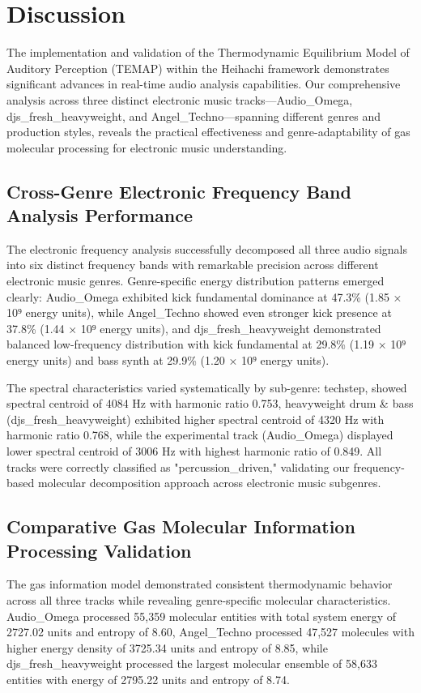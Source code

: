 \section{Discussion}

The implementation and validation of the Thermodynamic Equilibrium Model of Auditory Perception (TEMAP) within the Heihachi framework demonstrates significant advances in real-time audio analysis capabilities. Our comprehensive analysis across three distinct electronic music tracks—Audio\_Omega, djs\_fresh\_heavyweight, and Angel\_Techno—spanning different genres and production styles, reveals the practical effectiveness and genre-adaptability of gas molecular processing for electronic music understanding.

\subsection{Cross-Genre Electronic Frequency Band Analysis Performance}

The electronic frequency analysis successfully decomposed all three audio signals into six distinct frequency bands with remarkable precision across different electronic music genres. Genre-specific energy distribution patterns emerged clearly: Audio\_Omega exhibited kick fundamental dominance at 47.3\% (1.85 × 10⁹ energy units), while Angel\_Techno showed even stronger kick presence at 37.8\% (1.44 × 10⁹ energy units), and djs\_fresh\_heavyweight demonstrated balanced low-frequency distribution with kick fundamental at 29.8\% (1.19 × 10⁹ energy units) and bass synth at 29.9\% (1.20 × 10⁹ energy units). 

The spectral characteristics varied systematically by sub-genre: techstep, showed spectral centroid of 4084 Hz with harmonic ratio 0.753, heavyweight drum \& bass (djs\_fresh\_heavyweight) exhibited higher spectral centroid of 4320 Hz with harmonic ratio 0.768, while the experimental track (Audio\_Omega) displayed lower spectral centroid of 3006 Hz with highest harmonic ratio of 0.849. All tracks were correctly classified as "percussion\_driven," validating our frequency-based molecular decomposition approach across electronic music subgenres.

\subsection{Comparative Gas Molecular Information Processing Validation}

The gas information model demonstrated consistent thermodynamic behavior across all three tracks while revealing genre-specific molecular characteristics. Audio\_Omega processed 55,359 molecular entities with total system energy of 2727.02 units and entropy of 8.60, Angel\_Techno processed 47,527 molecules with higher energy density of 3725.34 units and entropy of 8.85, while djs\_fresh\_heavyweight processed the largest molecular ensemble of 58,633 entities with energy of 2795.22 units and entropy of 8.74.

